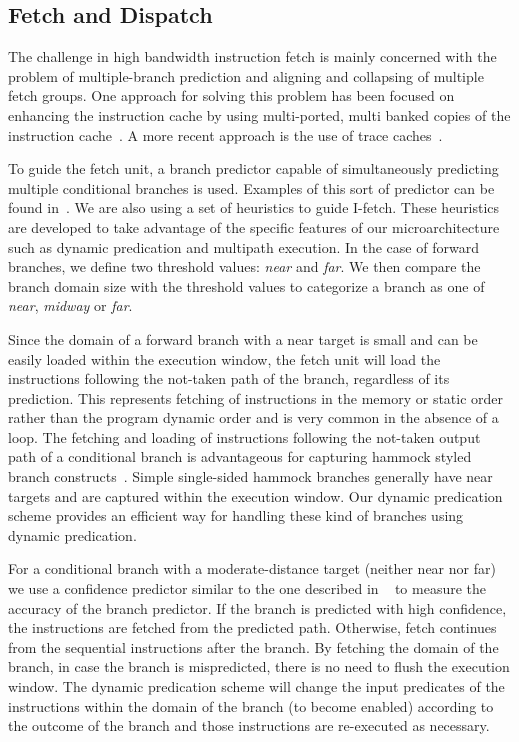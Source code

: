\documentclass[10pt,twocolumn]{IEEEtran}
\begin{document}
\subsection {Fetch and Dispatch}
%
The challenge in high bandwidth instruction fetch is mainly concerned
with the problem of multiple-branch prediction and aligning and
collapsing of multiple fetch groups.  One approach for solving this
problem has been focused on enhancing the instruction cache by using
multi-ported, multi banked copies of the instruction
cache~\cite{Yeh93b,Conte95,Seznec96,Wallace97}.
A more recent approach is the use of trace
caches~\cite{Rotenberg96,Jacobson97,Friendly97}.

To guide the fetch unit, a branch predictor capable of simultaneously
predicting multiple conditional
branches is used.  Examples of this sort of predictor can be found
in~\cite{Seznec96,Preston02}.  We are also
using a set of heuristics to guide I-fetch.  These heuristics are
developed to take advantage of the specific 
features of our microarchitecture
such as dynamic predication and multipath execution.
In the case of forward branches, we define two threshold values:
\emph{near} and \emph{far}.  We then compare the
branch domain size with the threshold values to categorize a
branch as one of \emph{near}, \emph{midway} or \emph{far}.

Since the domain of a forward branch with a near target
is small and can be easily
loaded within the execution window, the fetch unit will load the
instructions following the not-taken path of the branch, regardless of
its prediction.  This represents fetching of instructions in
the memory or static order rather than the program dynamic order and is
very common in the absence of a loop.  The fetching and loading of
instructions following the not-taken output path of a conditional
branch is advantageous for capturing hammock styled branch
constructs~\cite{Klauser98b}.  Simple single-sided hammock branches 
generally have
near targets and are captured within the execution window.  Our dynamic
predication scheme provides an efficient way for handling these kind of
branches using dynamic predication.

For a conditional branch with a moderate-distance target (neither
near nor far)
we use a confidence predictor
similar to the one described in ~\cite{Jacobsen96} to measure the
accuracy of the branch predictor.  If the branch is predicted with
high confidence, the instructions are fetched from the predicted
path.  Otherwise, fetch continues from
the sequential instructions after the branch.  By fetching the domain of
the branch, in case the branch is mispredicted, there is no need to flush the
execution window.  The dynamic predication scheme will change the input
predicates of the instructions within the domain of the branch (to become
enabled)
according to the outcome of the branch and
those instructions are re-executed as necessary.
\end{document}
